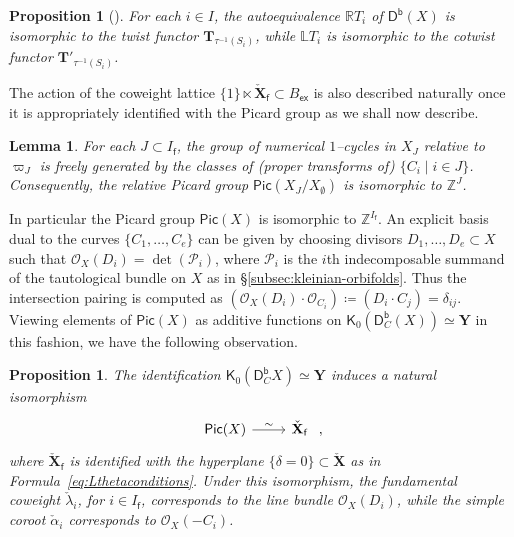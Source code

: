 \documentclass[reqno,a4paper]{amsart}
\newcommand{\calP}{\mathcal{P}}
\newcommand{\LL}{\mathbb{L}}
\newcommand{\R}{\mathbb{R}}
\newcommand{\Z}{\mathbb{Z}}
\newcommand{\scrO}{\mathscr{O}}
\newcommand{\sfK}{\mathsf{K}}
\newcommand{\sff}{\mathsf{f}}
\newcommand{\bfT}{\mathbf{T}}
\newcommand{\bfY}{\mathbf{Y}}
\newcommand{\bfX}{\mathbf{X}}
\newcommand{\catDb}{\mathsf{D}^\mathsf{b}}
\newcommand{\catDbC}{\mathsf{D}^\mathsf{b}_C}
\newcommand{\Lalpha}{\check{\alpha}}
\newcommand{\Llambda}{{\check{\lambda}}}
\newcommand{\rootlattice}{\bfY}
\newcommand{\weightlattice}{\bfX}
\newcommand{\coweightlattice}{\check{\weightlattice}}
\newcommand{\coweightlatticefin}{\coweightlattice_\sff}
\newcommand{\sfex}{\mathsf{ex}}
\newcommand{\rsv}{X}
\newcommand{\ssv}{X_\emptyset}
\newcommand{\psv}{X_J}
\newcommand{\Pic}{\mathsf{Pic}}
\theoremstyle{basic-theorem}
\newtheorem{lemma}[theorem]{Lemma}
\newtheorem{proposition}[theorem]{Proposition}
\numberwithin{equation}{section}
\begin{document}
\begin{proposition}[{\cite[Proposition~\ref*{COHA-Yangian-prop:tilt_twist_thm}]{DPSSV-3}}]\label{prop:tilt_twist_thm}
    For each $i\in I$, the autoequivalence $\R T_i$ of $\catDb(\rsv)$ is isomorphic to the twist functor $\bfT_{\tau^{-1}(S_i)}$, while $\LL T_i$ is isomorphic to the cotwist functor $\bfT'_{\tau^{-1}(S_i)}$.
\end{proposition}
The action of the coweight lattice $\{1\}\ltimes \coweightlatticefin\subset B_\sfex$ is also described naturally once it is appropriately identified with the Picard group as we shall now describe.

\begin{lemma}
    For each $J\subset I_\sff$, the group of numerical $1$--cycles in $\psv$ relative to $\varpi_J$ is freely generated by the classes of (proper transforms of) $\{C_i\;\vert\; i\in J\}$. Consequently, the relative Picard group $\Pic(\psv/\ssv)$ is isomorphic to $\Z^J$.
\end{lemma}

In particular the Picard group $\Pic(\rsv)$ is isomorphic to $\Z^{I_\sff}$. An explicit basis dual to the curves $\{C_1,\ldots,C_e\}$ can be given by choosing divisors $D_1,\ldots,D_e\subset \rsv$ such that $\scrO_\rsv(D_i)=\det(\calP_i)$, where $\calP_i$ is the $i$th indecomposable summand of the tautological bundle on $\rsv$ as in \S\ref{subsec:kleinian-orbifolds}. Thus the intersection pairing is computed as $(\scrO_\rsv(D_i)\cdot \scrO_{C_i})\coloneqq(D_i\cdot C_j)=\delta_{ij}$. Viewing elements of $\Pic(\rsv)$ as additive functions on $\sfK_0(\catDbC(\rsv))\simeq \rootlattice$ in this fashion, we have the following observation.

\begin{proposition}\label{prop:pic-coweight}
	The identification $\sfK_0(\catDbC\rsv)\simeq \rootlattice$ induces a natural isomorphism
	\begin{align}\label{eq:Pic}
		\begin{tikzcd}[ampersand replacement=\&]
			\Pic(\rsv) \ar{r}{\sim} \& \coweightlatticefin
		\end{tikzcd}\ ,
	\end{align}
    where $\coweightlatticefin$ is identified with the hyperplane $\{\delta=0\}\subset \coweightlattice$ as in Formula~\eqref{eq:Lthetaconditions}. Under this isomorphism, the fundamental coweight $\Llambda_i$, for $i\in I_\sff$, corresponds to the line bundle $\scrO_\rsv(D_i)$, while the simple coroot $\Lalpha_i$ corresponds to $\scrO_\rsv(-C_i)$.
\end{proposition}
\end{document}

